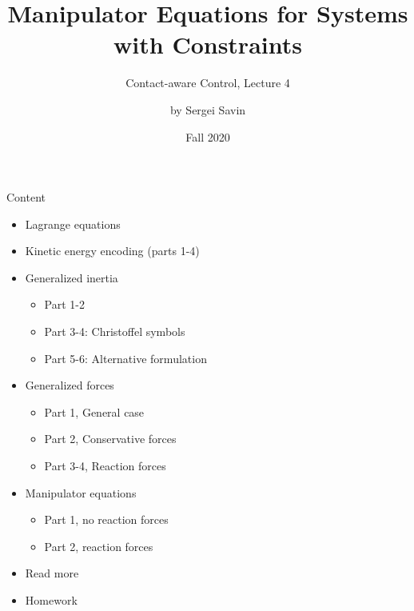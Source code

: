 \documentclass{beamer}
\title{Manipulator Equations for Systems with Constraints}
\subtitle{Contact-aware Control, Lecture 4}
\author{by Sergei Savin}
\date{Fall 2020}
\begin{document}
\maketitle


\begin{frame}{Content}

\begin{itemize}
\item Lagrange equations
\item Kinetic energy encoding (parts 1-4)
\item Generalized inertia
\begin{itemize}
\item Part 1-2
\item Part 3-4: Christoffel symbols
\item Part 5-6: Alternative formulation
\end{itemize}
\item Generalized forces
\begin{itemize}
\item Part 1, General case
\item Part 2, Conservative forces
\item Part 3-4, Reaction forces
\end{itemize}
\item Manipulator equations
\begin{itemize}
\item Part 1, no reaction forces
\item Part 2, reaction forces
\end{itemize}
\item Read more
\item Homework
\end{itemize}

\end{frame}
\end{document}
